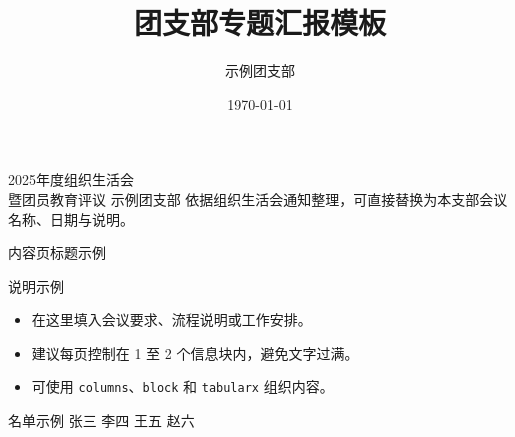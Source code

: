 \documentclass[aspectratio=169]{ctexbeamer}
\title{团支部专题汇报模板}
\author{示例团支部}
\date{\today}
\begin{document}
\TYTitlePage
  {2025年度组织生活会\\暨团员教育评议}
  {示例团支部}
  {依据组织生活会通知整理，可直接替换为本支部会议名称、日期与说明。}



\begin{TYContentFrame}{内容页标题示例}
  \begin{block}{说明示例}
    \begin{itemize}
      \item 在这里填入会议要求、流程说明或工作安排。
      \item 建议每页控制在 1 至 2 个信息块内，避免文字过满。
      \item 可使用 \texttt{columns}、\texttt{block} 和 \texttt{tabularx} 组织内容。
    \end{itemize}
  \end{block}

  \begin{block}{名单示例}
    \small
    张三 \qquad 李四 \qquad 王五 \qquad 赵六 
  \end{block}

\end{TYContentFrame}

\end{document}
